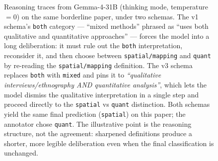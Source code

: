 \begin{figure}[t]
  \caption{Reasoning traces from Gemma-4-31B (thinking mode, temperature
    $=0$) on the same borderline paper, under two schemas. The v1 schema's
    \texttt{both} category --- ``mixed methods'' phrased as ``uses both
    qualitative and quantitative approaches'' --- forces the model into a
    long deliberation: it must rule out the \texttt{both} interpretation,
    reconsider it, and then choose between \texttt{spatial/mapping} and
    \texttt{quant} by re-reading the \texttt{spatial/mapping} definition.
    The v3 schema replaces \texttt{both} with \texttt{mixed} and pins it to
    \emph{``qualitative interviews/ethnography AND quantitative analysis''},
    which lets the model dismiss the qualitative interpretation in a single
    step and proceed directly to the \texttt{spatial} vs \texttt{quant}
    distinction. Both schemas yield the same final prediction (\texttt{spatial})
    on this paper; the annotator chose \texttt{quant}. The illustrative
    point is the reasoning structure, not the agreement: sharpened
    definitions produce a shorter, more legible deliberation even when the
    final classification is unchanged.}
  \label{fig:reasoning-trace-ghana}
\end{figure}
